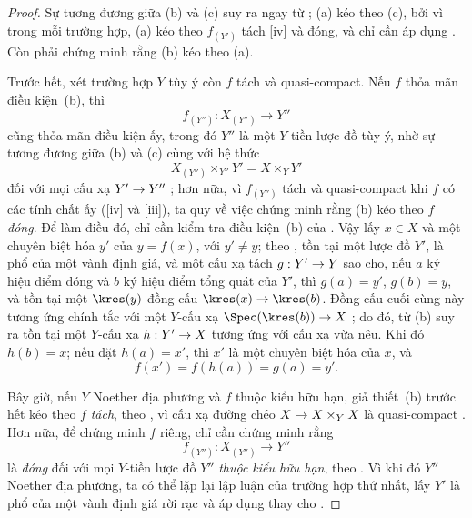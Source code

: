 \documentclass[oneside,10pt]{amsart}
\makeatletter
\newcommand{\ega@arrow}[2]{\mathchoice{#1}{#2}{#2}{#2}}
\renewcommand{\to}{\ega@arrow{\longrightarrow}{\rightarrow}}
\makeatother
\begin{document}
\begin{proof}
Sự tương đương giữa (b) và (c) suy ra ngay từ ;
(a) kéo theo (c), bởi vì trong mỗi trường hợp, (a) kéo theo $f_{(Y')}$ tách [iv] và đóng, và chỉ cần áp dụng .
Còn phải chứng minh rằng (b) kéo theo (a).

Trước hết, xét trường hợp $Y$ tùy ý còn $f$ tách và quasi-compact.
Nếu $f$ thỏa mãn điều kiện~(b), thì
\[
  f_{(Y'')}:X_{(Y'')}\longrightarrow Y''
\]
cũng thỏa mãn điều kiện ấy, trong đó $Y''$ là một $Y$-tiền lược đồ tùy ý, nhờ sự tương đương giữa (b) và (c) cùng với hệ thức
\[
  X_{(Y'')}\times_{Y''}Y'=X\times_Y Y'
\]
đối với mọi cấu xạ $Y'\to Y''$ ;
hơn nữa, vì $f_{(Y'')}$ tách và quasi-compact khi $f$ có các tính chất ấy ([iv] và [iii]), ta quy về việc chứng minh rằng (b) kéo theo $f$ \emph{đóng}.
Để làm điều đó, chỉ cần kiểm tra điều kiện~(b) của .
Vậy lấy $x\in X$ và một chuyên biệt hóa $y'$ của $y=f(x)$, với $y'\ne y$;
theo , tồn tại một lược đồ $Y'$, là phổ của một vành định giá, và một cấu xạ tách $g:Y'\to Y$ sao cho, nếu $a$ ký hiệu điểm đóng và $b$ ký hiệu điểm tổng quát của $Y'$, thì $g(a)=y'$, $g(b)=y$, và tồn tại một $\kres(y)$-đồng cấu $\kres(x)\to\kres(b)$.
Đồng cấu cuối cùng này tương ứng chính tắc với một $Y$-cấu xạ $\Spec(\kres(b))\to X$ ; do đó, từ (b) suy ra tồn tại một $Y$-cấu xạ $h:Y'\to X$ tương ứng với cấu xạ vừa nêu.
Khi đó $h(b)=x$;
nếu đặt $h(a)=x'$, thì $x'$ là một chuyên biệt hóa của $x$, và
\[
  f(x')=f(h(a))=g(a)=y'.
\]

Bây giờ, nếu $Y$ Noether địa phương và $f$ thuộc kiểu hữu hạn, giả thiết~(b) trước hết kéo theo $f$ \emph{tách}, theo , vì cấu xạ đường chéo $X\to X\times_Y X$ là quasi-compact .
Hơn nữa, để chứng minh $f$ riêng, chỉ cần chứng minh rằng
\[
  f_{(Y'')}:X_{(Y'')}\longrightarrow Y''
\]
là \emph{đóng} đối với mọi $Y$-tiền lược đồ $Y''$ \emph{thuộc kiểu hữu hạn}, theo .
Vì khi đó $Y''$ Noether địa phương, ta có thể lặp lại lập luận của trường hợp thứ nhất, lấy $Y'$ là phổ của một vành định giá rời rạc và áp dụng  thay cho .
\end{proof}
\end{document}
